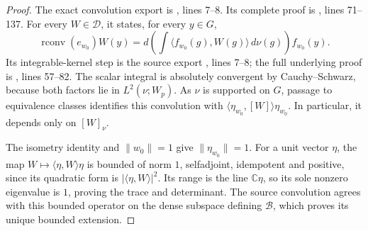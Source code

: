 \documentclass[11pt,a4paper]{article}
\begin{document}
\begin{proof}
The exact convolution export is
,
lines 7--8. Its complete proof is
, lines 71--137.
For every \(W\in\mathcal D\), it states, for every \(y\in G\),
\[
 \operatorname{rconv}(e_{w_0})W(y)
 =d\left(\int\langle f_{w_0}(g),W(g)\rangle\,d\nu(g)\right)
      f_{w_0}(y).
\]
Its integrable-kernel step is the source export
, lines 7--8;
the full underlying proof is
, lines 57--82.
The scalar integral is absolutely convergent by Cauchy--Schwarz,
because both factors lie in \(L^2(\nu;W_p)\).
As \(\nu\) is supported on \(G\), passage to equivalence classes
identifies this convolution with
\(\langle\eta_{w_0},[W]\rangle\eta_{w_0}\).
In particular, it depends only on \([W]_\nu\).

The isometry identity and \(\|w_0\|=1\) give
\(\|\eta_{w_0}\|=1\).
For a unit vector \(\eta\), the map \(W\mapsto\langle\eta,W\rangle\eta\)
is bounded of norm \(1\), selfadjoint, idempotent and positive,
since its quadratic form is \(|\langle\eta,W\rangle|^2\).
Its range is the line \(\mathbb C\eta\), so its sole nonzero
eigenvalue is \(1\), proving the trace and determinant.
The source convolution agrees with this bounded operator on the
dense subspace defining \(\mathcal B\), which proves its unique
bounded extension.
\end{proof}
\end{document}
